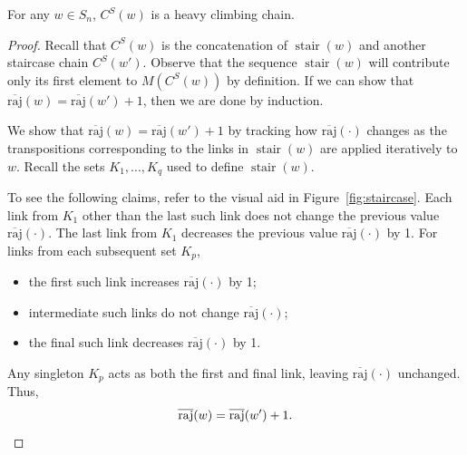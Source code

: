 \documentclass[ALCO]{cedram}
\newcommand{\absoverrajcode}[1]{\overline{\mathrm{raj}}(#1)}
\DeclareMathOperator{\stair}{\mathrm{stair}}
\newcommand{\CS}{C^S}
\begin{document}
\begin{theorem}
	\label{thm:staircaseheavy}
	For any $w\in S_n$, $\CS(w)$ is a heavy climbing chain.	
\end{theorem}
\begin{proof} 
	Recall that $\CS(w)$ is the concatenation of $\stair(w)$ and another staircase chain $\CS(w')$. 
	Observe that the sequence $\stair(w)$ will contribute only its first element to $M(\CS(w))$ by definition. If we can show that $\absoverrajcode{w}= \absoverrajcode{w'}+1$, then we are done by induction. 
	
	We show that $\absoverrajcode{w}= \absoverrajcode{w'}+1$ by tracking how $\absoverrajcode{\cdot}$ changes as the transpositions corresponding to the links in $\stair(w)$ are applied iteratively to~$w$. Recall the sets $K_1,\ldots,K_q$ used to define $\stair(w)$. 
	
	To see the following claims, refer to the visual aid in Figure~\ref{fig:staircase}. Each link from $K_1$ other than the last such link does not change the previous value $\absoverrajcode{\cdot}$. The last link from $K_1$ decreases the previous value $\absoverrajcode{\cdot}$ by 1. For links from each subsequent set $K_p$, 
	\begin{itemize}
		\item the first such link increases $\absoverrajcode{\cdot}$ by 1;
		\item intermediate such links do not change $\absoverrajcode{\cdot}$;
		\item the final such link decreases $\absoverrajcode{\cdot}$ by 1.
	\end{itemize}
	Any singleton $K_p$ acts as both the first and final link, leaving $\absoverrajcode{\cdot}$ unchanged. Thus, \[\absoverrajcode{w}= \absoverrajcode{w'}+1.\qedhere\]
\end{proof}	
\end{document}
